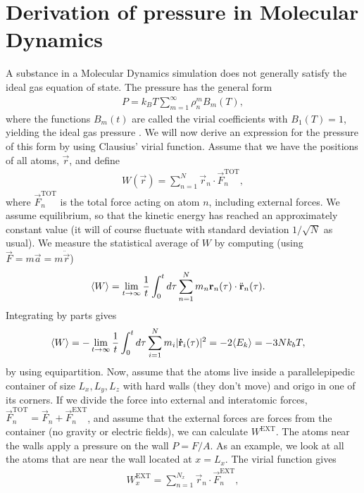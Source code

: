 \chapter{Derivation of pressure in Molecular Dynamics}
\label{sec:pressure_derivation}
A substance in a Molecular Dynamics simulation does not generally satisfy the ideal gas equation of state. The pressure has the general form
\begin{align}
    P = k_B T\sum_{m=1}^\infty \rho_n^mB_m(T),
\end{align}
where the functions $B_m(t)$ are called the virial coefficients with $B_1(T) = 1$, yielding the ideal gas pressure \cite{ravndal2008statmech}. We will now derive an expression for the pressure of this form by using Clausius' virial function. Assume that we have the positions of all atoms, $\vec r$, and define 
\begin{align}
    W(\vec r) = \sum_{n=1}^N \vec r_n \cdot \vec F_n^\text{TOT},
\end{align}
where $\vec F_n^\text{TOT}$ is the total force acting on atom $n$, including external forces. We assume equilibrium, so that the kinetic energy has reached an approximately constant value (it will of course fluctuate with standard deviation $1/\sqrt N$ as usual). We measure the statistical average of $W$ by computing (using $\vec F = m\vec a = m\ddot{\vec{r}}$)
\begin{align}
    \langle W \rangle &= \lim_{t\rightarrow\infty} {1\over t} \int_0^t d\tau \sum_{n=1}^N m_n \vec r_n(\tau) \cdot \ddot{\vec{r}}_n(\tau).
\end{align}
Integrating by parts gives
\begin{align}
    \label{eq:virial_and_equi}
    \langle W \rangle &= -\lim_{t\rightarrow\infty} {1\over t} \int_0^t d\tau \sum_{i=1}^N m_i |\vec{\dot r}_i(\tau)|^2 = -2\langle E_k \rangle = -3Nk_bT,
\end{align}
by using equipartition. Now, assume that the atoms live inside a parallelepipedic container of size $L_x, L_y, L_z$ with hard walls (they don't move) and origo in one of its corners. If we divide the force into external and interatomic forces, $\vec F_n^\text{TOT} = \vec F_n + \vec F_n^\text{EXT}$, and assume that the external forces are forces from the container (no gravity or electric fields), we can calculate $W^\text{EXT}$. The atoms near the walls apply a pressure on the wall $P = F/A$. As an example, we look at all the atoms that are near the wall located at $x=L_x$. The virial function gives
\begin{align}
    W^\text{EXT}_x = \sum_{n=1}^{N_x}\vec r_n\cdot \vec F_n^\text{EXT},
\end{align}
